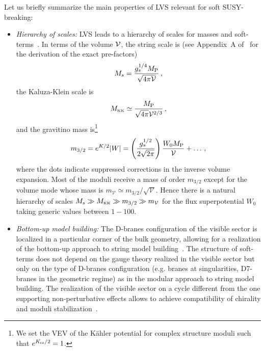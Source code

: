 \documentclass[12pt,a4paper]{book}
\def\KK{{\scriptscriptstyle \rm KK}}
\newcommand{\V}{{\cal{V}}}
\begin{document}
Let us briefly summarize the main properties of LVS relevant for soft SUSY-breaking:
\begin{itemize}
\item{\it Hierarchy of scales:} LVS leads to a hierarchy of scales for masses and soft-terms~\cite{Conlon:2005ki}.
In terms of the volume $\V$, the string scale is (see Appendix~A of~\cite{Conlon:2005ki} for the derivation of the exact pre-factors)
\begin{align}
M_s = \frac{g_s^{1/4} M_{\rm P}}{\sqrt{4\pi\mathcal{V}}}\,,
\label{Ms}
\end{align}
the Kaluza-Klein scale is
\begin{align}
M_\KK\simeq \frac{M_{\rm P}}{\sqrt{4\pi}\mathcal{V}^{2/3}}\,,
\label{MKK}
\end{align}
and the gravitino mass is\footnote{We set the VEV of the K\"ahler potential for complex structure moduli such that $e^{{K_{\rm cs}}/2}=1$.}
\begin{align}
m_{3/2} = e^{K/2} |W|= \left(\frac{g_s^{1/2}}{2\sqrt{2\pi}}\right) \frac{W_0 M_{\rm P}}{\mathcal{V}} +\ldots\, ,
\label{m32}
\end{align}
where the dots indicate suppressed corrections in the inverse volume expansion. Most of the moduli receive a mass of order $m_{3/2}$ except for the volume mode whose mass is $m_\mathcal{V} \simeq m_{3/2}/\sqrt{\mathcal{V}}$. Hence there is a natural hierarchy of scales $M_s\gg M_\KK\gg m_{3/2}\gg m_\mathcal{V}$ for the flux superpotential $W_0$ taking generic values between $1-100$.

\item {\it Bottom-up model building:} The D-branes configuration of the visible sector is localized in a particular corner of the bulk geometry, allowing for a realization of the bottom-up approach to string model building~\cite{Aldazabal:2000sa}. The structure of soft-terms does not depend on the gauge theory realized in the visible sector but only on the type of D-branes configuration (e.g. branes at singularities, D7-branes in the geometric regime) as in the modular approach to string model building. The realization of the visible sector on a cycle different from the one supporting non-perturbative effects allows to achieve compatibility of chirality and moduli stabilization~\cite{Blumenhagen:2007sm,Cicoli:2011qg}.


\end{itemize}
\end{document}
